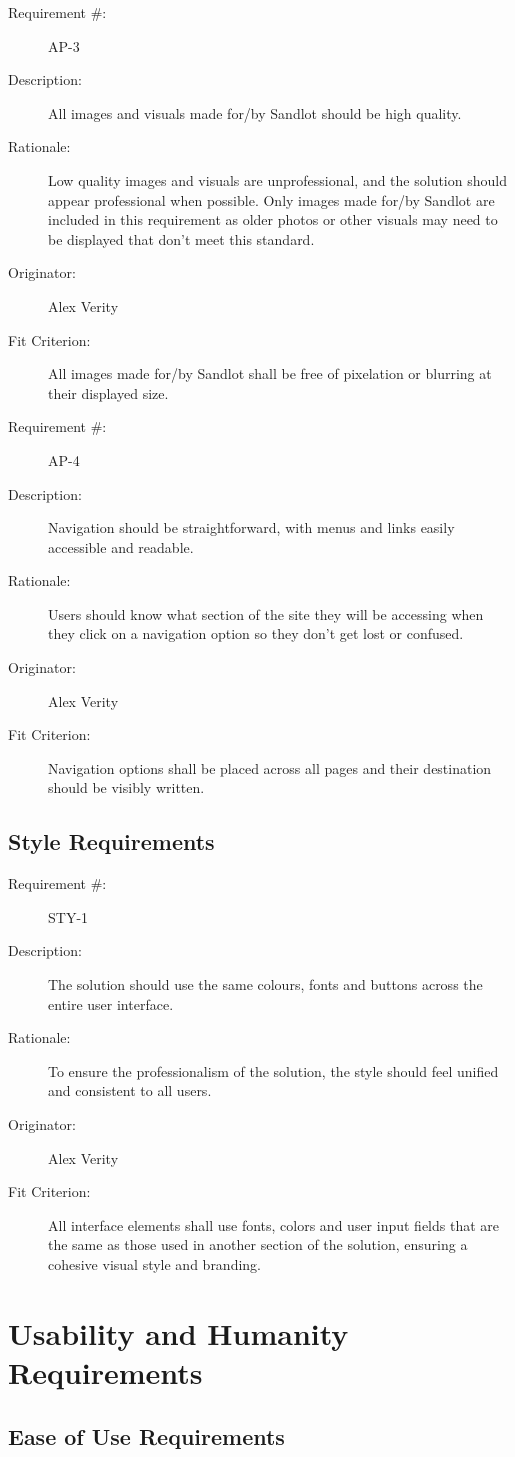 \documentclass[12pt]{article}
\newenvironment{myreq}[1]{%
\setlist[description]{font=\normalfont\color{darkgray}}%
\begin{tcolorbox}[colframe=black,colback=white, sharp corners, boxrule=1pt]%
\bfseries\color{blue}%
\begin{description}#1}%
{\end{description}\end{tcolorbox}}
\newcommand{\twoinline}[2]{\begin{multicols}{2}#1 #2\end{multicols}}
\newcommand{\reqno}{\item[Requirement \#:]}
\newcommand{\reqdesc}{\item[Description:]}
\newcommand{\reqrat}{\item[Rationale:]}
\newcommand{\reqorig}{\item[Originator:]}
\newcommand{\reqfit}{\item[Fit Criterion:]}
\newcommand{\reqsatis}{\item[Customer Satisfaction:]}
\newcommand{\reqdissat}{\item[Customer Dissatisfaction:]}
\begin{document}
\begin{myreq}
  \reqno AP-3
  \reqdesc All images and visuals made for/by Sandlot should be high quality.
  \reqrat Low quality images and visuals are unprofessional, and the solution
  should appear professional when possible. Only images made for/by Sandlot
  are included in this requirement as older photos or other visuals may need
  to be displayed that don't meet this standard.
  \reqorig Alex Verity
  \reqfit All images made for/by Sandlot shall be free of pixelation or
  blurring at their displayed size.
  \twoinline
    {\reqsatis 2}
    {\reqdissat 2}
\end{myreq}

\begin{myreq}
  \reqno AP-4
  \reqdesc Navigation should be straightforward, with menus and links easily
  accessible and readable.
  \reqrat Users should know what section of the site they will be accessing
  when they click on a navigation option so they don't get lost or confused.
  \reqorig Alex Verity
  \reqfit Navigation options shall be placed across all pages and their
  destination should be visibly written.
  \twoinline
    {\reqsatis 2}
    {\reqdissat 4}
\end{myreq}

\subsection{Style Requirements}

\begin{myreq}
  \reqno STY-1
  \reqdesc The solution should use the same colours, fonts and buttons across
  the entire user interface.
  \reqrat To ensure the professionalism of the solution, the style should
  feel unified and consistent to all users.
  \reqorig Alex Verity
  \reqfit All interface elements shall use fonts, colors and user input fields
  that are the same as those used in another section of the solution, ensuring
  a cohesive visual style and branding.
  \twoinline
    {\reqsatis 2}
    {\reqdissat 2}
\end{myreq}

\section{Usability and Humanity Requirements}
\subsection{Ease of Use Requirements}
\end{document}
